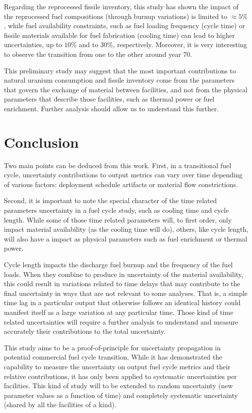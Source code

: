 \documentclass{anstrans}
\begin{document}
Regarding the reprocessed fissile inventory, this study has shown the impact of
the reprocessed fuel compositions (through burnup variations) is limited to
$\approx5\%$, while fuel availability constraints, such as fuel loading
frequency (cycle time) or fissile materials available for fuel fabrication
(cooling time) can lead to higher uncertainties, up to $10\%$ and to $30\%$,
respectively.  Moreover, it is very interesting to observe the transition from
one to the other around year 70.

This preliminary study may suggest that the most important contributions to
natural uranium consumption and fissile inventory come from the parameters that
govern the exchange of material between facilities, and not from the physical
parameters that describe those facilities, such as thermal power or fuel
enrichment. Further analysis should allow us to understand this further.


\section{Conclusion}

Two main points can be deduced from this work.  First, in a transitional fuel
cycle, uncertainty contributions to output metrics can vary over time depending
of various factors: deployment schedule artifacts or material flow
constrictions.

Second, it is important to note the special character of the time related
parameters uncertainty in a fuel cycle study, such as cooling time and cycle
length.  While some of those time related parameters will, to first order, only
impact material availability (as the cooling time will do), others, like cycle
length, will also have a impact as physical parameters such as fuel enrichment
or thermal power.  

Cycle length impacts the discharge fuel burnup and  the frequency of the fuel
loads.  When they combine to produce in uncertainty of the material
availability, this could result in variations related to time delays that may
contribute to the final uncertainty in ways that are not relevant to some
analyses.  That is, a simple time lag in a particular output that otherwise
follows an identical history could manifest itself as a large variation at any
particular time.  Those kind of time related uncertainties will require a
further analysis to understand and measure accurately their contributions to the
total uncertainty.

This study aims to be a proof-of-principle for uncertainty propagation in
potential commercial fuel cycle transition.  While it has demonstrated the
capability to measure the uncertainty on output fuel cycle metrics and their
relative contributions, it has only been applied to systematic uncertainties per
facilities.  This kind of study will to be extended to random uncertainty (new
parameter values as a function of time) and completely systematic uncertainty
(shared by all the facilities of a kind).
\end{document}
